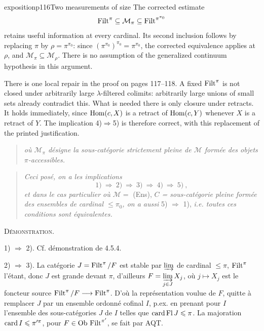 \begin{dcomment}{exposition}{p116}{Two measurements of size}
The corrected estimate
\[
 \operatorname{Filt}^\pi\subseteq\mathcal M_\pi
       \subseteq\operatorname{Filt}^{\pi^{\pi_0}}
\]
retains useful information at every cardinal. Its second inclusion follows by replacing $\pi$ by $\rho=\pi^{\pi_0}$: since $(\pi^{\pi_0})^{\pi_0}=\pi^{\pi_0}$, the corrected equivalence applies at $\rho$, and $\mathcal M_\pi\subseteq\mathcal M_\rho$. There is no assumption of the generalized continuum hypothesis in this argument.

There is one local repair in the proof on pages 117--118. A fixed $\operatorname{Filt}^\pi$ is not closed under arbitrarily large $\lambda$-filtered colimits: arbitrarily large unions of small sets already contradict this. What is needed there is only closure under retracts. It holds immediately, since $\mathrm{Hom}(c,X)$ is a retract of $\mathrm{Hom}(c,Y)$ whenever $X$ is a retract of $Y$. The implication 4)$\Rightarrow$5) is therefore correct, with this replacement of the printed justification.
\end{dcomment}


\begin{quote}
\textit{où $\mathcal{M}_\pi$ désigne la sous-catégorie strictement pleine de $\mathcal{M}$ formée des objets $\pi$-accessibles.}
\end{quote}

\begin{quote}
\textit{Ceci posé, on a les implications}
\[
\mathrm{1)} \ \Longrightarrow\ \mathrm{2)} \ \Longrightarrow\ \mathrm{3)} \ \Longrightarrow\ \mathrm{4)} \ \Longrightarrow\ \mathrm{5)} \ ,
\]
\textit{et dans le cas particulier où $\mathcal{M} = $} (Ens), \textit{$C$ = sous-catégorie pleine formée des ensembles de cardinal $\leqslant \pi_0$, on a aussi} 5) $\Longrightarrow$ 1), \textit{i.e. toutes ces conditions sont équivalentes.}
\end{quote}

\textsc{Démonstration.}

1) $\Longrightarrow$ 2). Cf. démonstration de 4.5.4.

2) $\Longrightarrow$ 3). La catégorie $J = \operatorname{Filt}^\pi/F$ est stable par $\varinjlim$ de cardinal $\leqslant \pi$, $\operatorname{Filt}^\pi$ l'étant, donc $J$ est grande devant $\pi$, d'ailleurs $F = \varinjlim\limits_{j\in J} X_j$, où $j \longmapsto X_j$ est le foncteur source $\operatorname{Filt}^\pi/F \longrightarrow \operatorname{Filt}^\pi$. D'où la représentation voulue de $F$, quitte à remplacer $J$ par un ensemble ordonné cofinal $I$, p.ex. en prenant pour $I$ l'ensemble des sous-catégories $J$ de $I$ telles que $\operatorname{card} \operatorname{Fl} J \leqslant \pi$. La majoration $\operatorname{card} I \leqslant \pi'^{\pi}$, pour $F \in \mathrm{Ob}\, \operatorname{Filt}^{\pi'}$, se fait par AQT.

